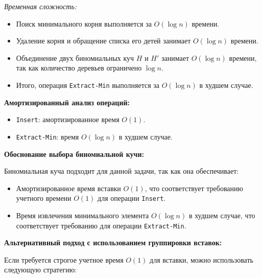 \documentclass[11pt]{article}
\begin{document}
\begin{solution}
    \textit{Временная сложность:}

    \begin{itemize}
        \item Поиск минимального корня выполняется за $O(\log n)$ времени.
        \item Удаление корня и обращение списка его детей занимает $O(\log n)$ времени.
        \item Объединение двух биномиальных куч $H$ и $H'$ занимает $O(\log n)$ времени, так как количество деревьев ограничено $\log n$.
        \item Итого, операция \texttt{Extract-Min} выполняется за $O(\log n)$ в худшем случае.
    \end{itemize}

    \textbf{Амортизированный анализ операций:}

    \begin{itemize}
        \item \texttt{Insert}: амортизированное время $O(1)$.
        \item \texttt{Extract-Min}: время $O(\log n)$ в худшем случае.
    \end{itemize}

    \textbf{Обоснование выбора биномиальной кучи:}

    Биномиальная куча подходит для данной задачи, так как она обеспечивает:

    \begin{itemize}
        \item Амортизированное время вставки $O(1)$, что соответствует требованию учетного времени $O(1)$ для операции \texttt{Insert}.
        \item Время извлечения минимального элемента $O(\log n)$ в худшем случае, что соответствует требованию для операции \texttt{Extract-Min}.
    \end{itemize}

    \textbf{Альтернативный подход с использованием группировки вставок:}

    Если требуется строгое учетное время $O(1)$ для вставки, можно использовать следующую стратегию:


\end{solution}
\end{document}
